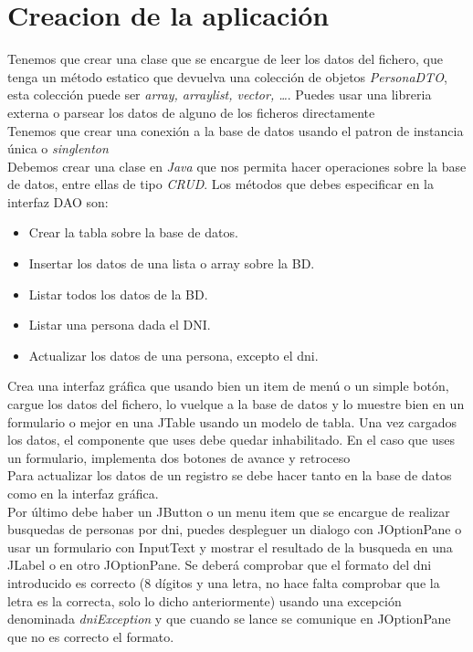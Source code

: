 \documentclass[4paper]{article}
\begin{document}
\section*{Creacion de la aplicación}
Tenemos que crear una clase que se encargue de leer los datos del fichero, que tenga un método estatico que devuelva una colección de objetos \emph{PersonaDTO}, esta colección puede ser \emph{array, arraylist, vector, \dots}. Puedes usar una libreria externa o parsear los datos de alguno de los ficheros directamente\\
Tenemos que crear una conexión a la base de datos usando el patron de instancia única o \emph{singlenton} \\
Debemos crear una clase en \emph{Java} que nos permita hacer operaciones sobre la base de datos, entre ellas de tipo \emph{CRUD}. Los métodos que debes especificar en la interfaz DAO son:
\begin{itemize}
\item Crear la tabla sobre la base de datos.
\item Insertar los datos de una lista o array sobre la BD.
\item Listar todos los datos de la BD.
\item Listar una persona dada el DNI.
\item Actualizar los datos de una persona, excepto el dni.
\end{itemize}
Crea una interfaz gráfica que usando bien un item de menú o un simple botón, cargue los datos del fichero, lo vuelque a la base de datos y lo muestre bien en un formulario o mejor en una JTable usando un modelo de tabla. Una vez cargados los datos, el componente que uses debe quedar inhabilitado. En el caso que uses un formulario, implementa dos botones de avance y retroceso\\
Para actualizar los datos de un registro se debe hacer tanto en la base de datos como en la interfaz gráfica.\\
Por último debe haber un JButton o un menu item que se encargue de realizar busquedas de personas por dni, puedes despleguer un dialogo con JOptionPane o usar un formulario con InputText y mostrar el resultado de la busqueda en una JLabel o en otro JOptionPane. Se deberá comprobar que el formato del dni introducido es correcto (8 dígitos y una letra, no hace falta comprobar que la letra es la correcta, solo lo dicho anteriormente) usando una excepción denominada \emph{dniException} y que cuando se lance se comunique en JOptionPane que no es correcto el formato.
\end{document}
